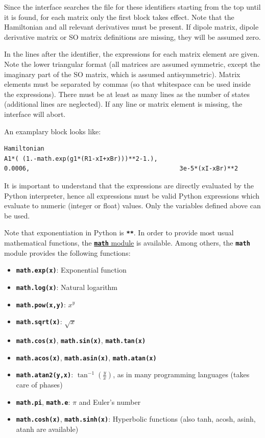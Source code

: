 \documentclass[a4paper,11pt,DIV=15,openany,twoside=false]{scrbook}
\newcommand{\ttt}[1]{\textbf{\texttt{#1}}}
\newenvironment{example}{
  \vspace{0mm}
  \definecolor{shadecolor}{HTML}{BBDDFF}
  \begin{shaded}
  \begin{minipage}{0.9\textwidth}
}{
  \end{minipage}
  \end{shaded}
}
\begin{document}
Since the interface searches the file for these identifiers starting from the top until it is found, for each matrix only the first block takes effect. Note that the Hamiltonian and all relevant derivatives must be present. If dipole matrix, dipole derivative matrix or SO matrix definitions are missing, they will be assumed zero.

In the lines after the identifier, the expressions for each matrix element are given. Note the lower triangular format (all matrices are assumed symmetric, except the imaginary part of the SO matrix, which is assumed antisymmetric). Matrix elements must be separated by commas (so that whitespace can be used inside the expressions). There must be at least as many lines as the number of states (additional lines are neglected). If any line or matrix element is missing, the interface will abort.

An examplary block looks like:
\begin{example}
  \begin{verbatim}
Hamiltonian
A1*( (1.-math.exp(g1*(R1-xI+xBr)))**2-1.),
0.0006,                                         3e-5*(xI-xBr)**2
  \end{verbatim}
\end{example}
It is important to understand that the expressions are directly evaluated by the Python interpreter, hence all expressions must be valid Python expressions which evaluate to numeric (integer or float) values. Only the variables defined above can be used. 

Note that exponentiation in Python is \ttt{**}. In order to provide most usual mathematical functions, the \href{https://docs.python.org/2/library/math.html}{\ttt{math} module} is available. Among others, the \ttt{math} module provides the following functions:
\begin{itemize}
  \item \ttt{math.exp(x)}: Exponential function
  \item \ttt{math.log(x)}: Natural logarithm
  \item \ttt{math.pow(x,y)}: $x^y$
  \item \ttt{math.sqrt(x)}: $\sqrt{x}$
  \item \ttt{math.cos(x)}, \ttt{math.sin(x)}, \ttt{math.tan(x)}
  \item \ttt{math.acos(x)}, \ttt{math.asin(x)}, \ttt{math.atan(x)}
  \item \ttt{math.atan2(y,x)}: $\tan^{-1}\left(\frac{y}{x}\right)$, as in many programming languages (takes care of phases)
  \item \ttt{math.pi}, \ttt{math.e}: $\pi$ and Euler's number
  \item \ttt{math.cosh(x)}, \ttt{math.sinh(x)}: Hyperbolic functions (also tanh, acosh, asinh, atanh are available)
\end{itemize}
\end{document}

